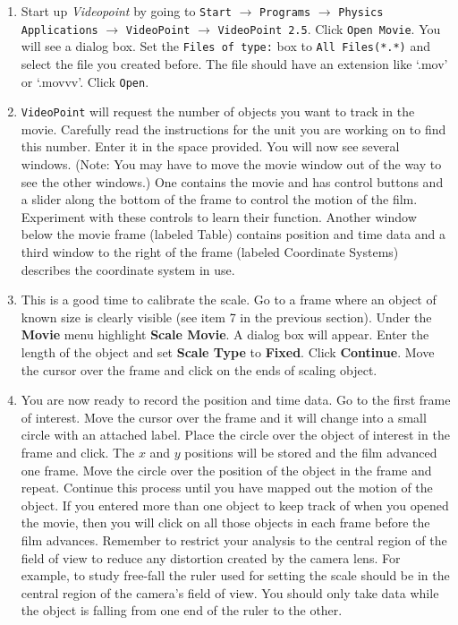 \begin{enumerate}

\item Start up {\it Videopoint} by
going to \texttt{Start} $\rightarrow$ \texttt{Programs} $\rightarrow$
\texttt{Physics Applications} $\rightarrow$ 
\texttt{VideoPoint} 
$\rightarrow$ \linebreak  
{\tt VideoPoint 2.5}.
Click {\tt Open Movie}. You will see a dialog box. Set the {\tt Files of type:}
box to {\tt All Files(*.*)} and select the file you created before.
The file should have an extension like `.mov' or `.movvv'.
Click {\tt Open}.

\item {\tt VideoPoint} will request the number of objects you want to
track in the movie. Carefully read the instructions for the unit you
are working on to find this number. Enter it in the space provided.
You will now see several windows. 
(Note: You may have to move the movie window out of the way to see the
other windows.) One contains the movie and has control
buttons and a slider along the bottom of the frame to control the
motion of the film. Experiment with these controls to learn their
function. Another window below the movie frame (labeled Table) contains position 
and time data and a third window to the right of the frame (labeled Coordinate
Systems) describes the coordinate system in use.

\item This is a good time to calibrate the scale. Go to a frame where an
object of known size is clearly visible (see item 7
in the previous
section). Under the \textbf{Movie} menu highlight \textbf{Scale Movie}.
A dialog box will appear. Enter the length of the object and set \textbf{Scale
Type} to \textbf{Fixed}. Click \textbf{Continue}. Move the cursor
over the frame and click on the ends of scaling object.

\item You are now ready to record the position and time data. Go to the
first frame of interest. Move the cursor over the frame and it will
change into a small circle with an attached label. Place the circle
over the object of interest in the frame and click. The $x$ and $y$ positions
will be stored and the film advanced one frame. Move the circle over
the position of the object in the frame and repeat. Continue this
process until you have mapped out the motion of the object. If you
entered more than one object to keep track of when you opened the
movie, then you will click on all those objects in each frame before
the film advances.
Remember to restrict your analysis to the central region of the field of view to
reduce any distortion created by the camera lens.
For example, to study free-fall the ruler used for setting the scale should be in the
central region of the camera's field of view. You should only take data while the object is falling from one
end of the ruler to the other.


\end{enumerate}
